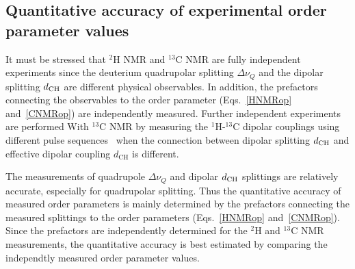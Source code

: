 \documentclass[aps,prl,superscriptaddress,twocolumn]{revtex4}
\begin{document}
\subsection{Quantitative accuracy of experimental order parameter values}

It must be stressed that $^2$H NMR and $^{13}$C NMR are fully independent experiments since the deuterium quadrupolar splitting $\Delta \nu_Q$
and the dipolar splitting $d_{{\rm CH}}$ are different physical observables. In addition, the prefactors connecting the observables to the order 
parameter (Eqs.~\ref{HNMRop} and~\ref{CNMRop}) are independently measured. Further independent experiments are performed With $^{13}$C NMR 
by measuring the $^1$H-$^{13}$C dipolar couplings using different pulse sequences~\cite{hong95a,gross97,dvinskikh05a,ferreira13} when the connection
between dipolar splitting $d_{{\rm CH}}$ and effective dipolar coupling $d_\mathrm{CH}$ is different.

The measurements of quadrupole $\Delta \nu_Q$ and dipolar $d_{{\rm CH}}$ splittings are relatively accurate, especially for quadrupolar splitting.
Thus the quantitative accuracy of measured order parameters is mainly determined by the  
prefactors connecting the measured splittings to the order parameters (Eqs.~\ref{HNMRop} and~\ref{CNMRop}). 
Since the prefactors are independently determined for the $^2$H and $^{13}$C NMR measurements,
the quantitative accuracy is best estimated by comparing the independtly measured order parameter values.
\end{document}
